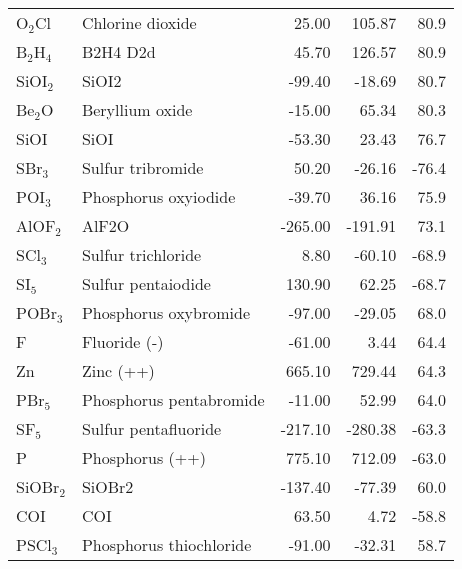 \begin{table}
\begin{center}
\begin{tabular}{llrrr}
 O$_2$Cl              & Chlorine dioxide                       &   25.00   &   105.87   &   80.9\\
 B$_2$H$_4$           & B2H4 D2d                               &   45.70   &   126.57   &   80.9\\
 SiOI$_2$             & SiOI2                                  &  -99.40   &   -18.69   &   80.7\\
 Be$_2$O              & Beryllium oxide                        &  -15.00   &    65.34   &   80.3\\
 SiOI                 & SiOI                                   &  -53.30   &    23.43   &   76.7\\
 SBr$_3$              & Sulfur tribromide                      &   50.20   &   -26.16   &  -76.4\\
 POI$_3$              & Phosphorus oxyiodide                   &  -39.70   &    36.16   &   75.9\\
 AlOF$_2$             & AlF2O                                  & -265.00   &  -191.91   &   73.1\\
 SCl$_3$              & Sulfur trichloride                     &    8.80   &   -60.10   &  -68.9\\
 SI$_5$               & Sulfur pentaiodide                     &  130.90   &    62.25   &  -68.7\\
 POBr$_3$             & Phosphorus oxybromide                  &  -97.00   &   -29.05   &   68.0\\
 F                    & Fluoride (-)                           &  -61.00   &     3.44   &   64.4\\
 Zn                   & Zinc (++)                              &  665.10   &   729.44   &   64.3\\
 PBr$_5$              & Phosphorus pentabromide                &  -11.00   &    52.99   &   64.0\\
 SF$_5$               & Sulfur pentafluoride                   & -217.10   &  -280.38   &  -63.3\\
 P                    & Phosphorus (++)                        &  775.10   &   712.09   &  -63.0\\
 SiOBr$_2$            & SiOBr2                                 & -137.40   &   -77.39   &   60.0\\
 COI                  & COI                                    &   63.50   &     4.72   &  -58.8\\
 PSCl$_3$             & Phosphorus thiochloride                &  -91.00   &   -32.31   &   58.7\\

\end{tabular}
\end{center}
\end{table}
